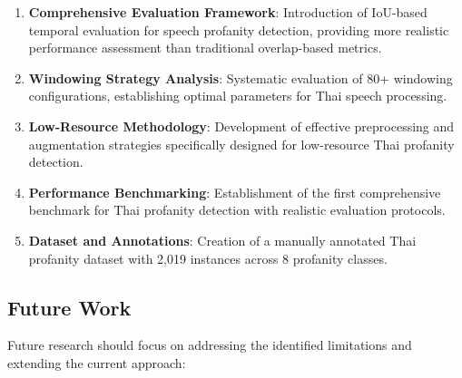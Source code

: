 \documentclass[11pt]{article}
\begin{document}
\begin{enumerate}
    \item \textbf{Comprehensive Evaluation Framework}: Introduction of IoU-based temporal evaluation for speech profanity detection, providing more realistic performance assessment than traditional overlap-based metrics.
    
    \item \textbf{Windowing Strategy Analysis}: Systematic evaluation of 80+ windowing configurations, establishing optimal parameters for Thai speech processing.
    
    \item \textbf{Low-Resource Methodology}: Development of effective preprocessing and augmentation strategies specifically designed for low-resource Thai profanity detection.
    
    \item \textbf{Performance Benchmarking}: Establishment of the first comprehensive benchmark for Thai profanity detection with realistic evaluation protocols.
    
    \item \textbf{Dataset and Annotations}: Creation of a manually annotated Thai profanity dataset with 2,019 instances across 8 profanity classes.
\end{enumerate}

\subsection{Future Work}
Future research should focus on addressing the identified limitations and extending the current approach:
\end{document}
